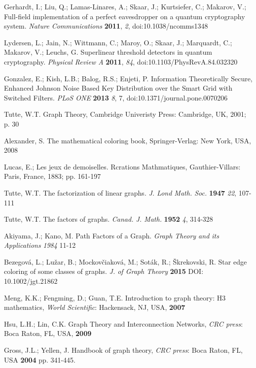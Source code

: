\documentclass[a4paper,12pt,pdftex]{article}
\begin{document}
\begin{thebibliography}{99}
Gerhardt, I.; Liu, Q.; Lamas-Linares, A.; Skaar, J.; Kurtsiefer, C.; Makarov, V.; Full-field implementation of a perfect eavesdropper on a quantum cryptography system. {\em Nature Communications} {\bf 2011}, {\em 2}, doi:10.1038/ncomms1348

Lydersen, L.; Jain, N.; Wittmann, C.; Maroy, O.; Skaar, J.; Marquardt, C.; Makarov, V.; Leuchs, G. Superlinear threshold detectors in quantum cryptography. {\em Physical Review A} {\bf 2011}, {\em 84}, doi:10.1103/PhysRevA.84.032320





Gonzalez, E.; Kish, L.B.; Balog, R.S.; Enjeti, P. Information Theoretically Secure, Enhanced Johnson Noise Based Key Distribution over the Smart Grid with Switched Filters. {\em PLoS ONE} {\bf 2013} {\em 8}, 7, doi:10.1371/journal.pone.0070206



Tutte, W.T. Graph Theory, Cambridge Univeristy Press: Cambridge, UK, 2001; p. 30

Alexander, S. The mathematical coloring book, Springer-Verlag: New York, USA, 2008

Lucas, E.; Les jeux de demoiselles. Rcrations Mathmatiques, Gauthier-Villars: Paris, France, 1883; pp. 161-197 

Tutte, W.T. The factorization of linear graphs. {\em J. Lond Math. Soc.} {\bf 1947} {\em 22}, 107-111

Tutte, W.T. The factors of graphs. {\em Canad. J. Math.} {\bf 1952} {\em 4}, 314-328

Akiyama, J.; Kano, M. Path Factors of a Graph. {\em Graph Theory and its Applications} {\em 1984} 11-12

Bezegov{\'a}, L.; Lu{\v{z}}ar, B.; Mockov{\v{c}}iakov{\'a}, M.; Sot{\'a}k, R.; {\v{S}}krekovski, R. Star edge coloring of some classes of graphs. {\em J. of Graph Theory} {\bf 2015} DOI: 10.1002/jgt.21862

Meng, K.K.; Fengming, D.; Guan, T.E. Introduction to graph theory: H3 mathematics, {\em World Scientific}: Hackensack, NJ, USA, {\bf 2007}

Hsu, L.H.; Lin, C.K. Graph Theory and Interconnection Networks, {\em CRC press}: Boca Raton, FL, USA, {\bf 2009}

Gross, J.L.; Yellen, J. Handbook of graph theory, {\em CRC press}: Boca Raton, FL, USA {\bf 2004} pp. 341-445.


\end{thebibliography}
\end{document}
